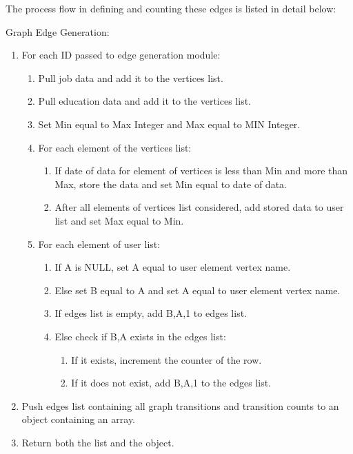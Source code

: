 \noindent The process flow in defining and counting these edges is listed
in detail below:

\begin{description}
    \item[Graph Edge Generation:]
\end{description}
\begin{enumerate}
  \item For each ID passed to edge generation module:
  \begin{enumerate}
    \item Pull job data and add it to the vertices list.
    \item Pull education data and add it to the vertices list.
    \item Set Min equal to Max Integer and Max equal to MIN Integer.
    \item For each element of the vertices list:
    \begin{enumerate}
      \item If date of data for element of vertices is less than Min and more
      than Max, store the data and set Min equal to date of data.
      \item After all elements of vertices list considered, add stored data
      to user list and set Max equal to Min.
  	\end{enumerate}
  	\item For each element of user list:
  	\begin{enumerate}
  	  \item If A is NULL, set A equal to user element vertex name.
  	  \item Else set B equal to A and set A equal to user element vertex name.
  	  \item If edges list is empty, add B,A,1 to edges list.
  	  \item Else check if B,A exists in the edges list:
  	  \begin{enumerate}
  	    \item If it exists, increment the counter of the row.
  	    \item If it does not exist, add B,A,1 to the edges list.
  	  \end{enumerate}
  	\end{enumerate}
  \end{enumerate}
  \item Push edges list containing all graph transitions and transition
  counts to an object containing an array.
  \item Return both the list and the object.
\end{enumerate}

